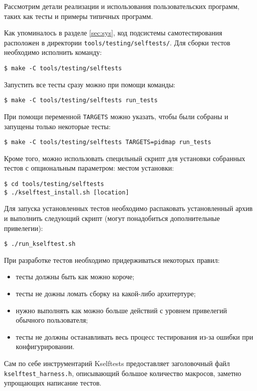 Рассмотрим детали реализации и использования пользовательских программ, таких
как тесты и примеры типичных программ.

Как упоминалось в разделе \ref{sec:sys}, код подсистемы самотестирования
расположен в директории \texttt{tools/testing/selftests/}. Для сборки тестов
необходимо исполнить команду:
\medskip
\begin{lstlisting}[style=cstyle]
$ make -C tools/testing/selftests
\end{lstlisting}
\medskip

Запустить все тесты сразу можно при помощи команды:
\medskip
\begin{lstlisting}[style=cstyle]
$ make -C tools/testing/selftests run_tests
\end{lstlisting}
\medskip

При помощи переменной \texttt{TARGETS} можно указать, чтобы были собраны и
запущены только некоторые тесты:
\medskip
\begin{lstlisting}[style=cstyle]
$ make -C tools/testing/selftests TARGETS=pidmap run_tests
\end{lstlisting}
\medskip

Кроме того, можно использовать специльный скрипт для установки собранных тестов
с опциональным параметром: местом установки:
\medskip
\begin{lstlisting}[style=cstyle]
$ cd tools/testing/selftests
$ ./kselftest_install.sh [location]
\end{lstlisting}
\medskip

Для запуска установленных тестов необходимо распаковать установленный архив и
выполнить следующий скрипт (могут понадобиться дополнительные привелегии):
\medskip
\begin{lstlisting}[style=cstyle]
$ ./run_kselftest.sh
\end{lstlisting}
\medskip

При разработке тестов необходимо придерживаться некоторых правил:
\begin{itemize}
\item тесты должны быть как можно короче;
\item тесты не дожны ломать сборку на какой-либо архитертуре;
\item нужно выполнять как можно больше действий с уровнем привелегий обычного
  пользователя;
\item тесты не должны останавливать весь процесс тестирования из-за ошибки при
  конфигурировании.
\end{itemize}

Сам по себе инструментарий Kselftests предоставляет заголовочный файл
\texttt{kselftest_harness.h}, описывающий большое количество макросов, заметно
упрощающих написание тестов.
